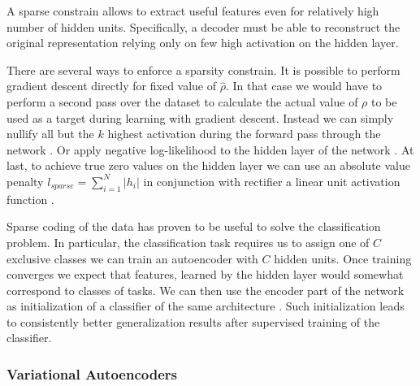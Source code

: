 A sparse constrain allows to extract useful features even for relatively high number of hidden units. Specifically, a decoder must be able to reconstruct the original representation relying only on few high activation on the hidden layer.

There are several ways to enforce a sparsity constrain.
It is possible to perform gradient descent directly for fixed value of $\hat{\rho}$. In that case we would have to perform a second pass over the dataset to calculate the actual value of $\rho$ to be used as a target during learning with gradient descent. Instead we can simply nullify all but the $k$ highest activation during the forward pass through the network \cite{Kulkarni2015}.
Or apply negative log-likelihood to the hidden layer of the network \cite{Zhao2015}.
At last, to achieve true zero values on the hidden layer we can use an absolute value penalty $l_{sparse}=\sum_{i=1}^N |h_i|$ in conjunction with rectifier a linear unit activation function \cite{Glorot2011}.

Sparse coding of the data has proven to be useful to solve the classification problem.
In particular, the classification task requires us to assign one of $C$ exclusive classes we can train an autoencoder with $C$ hidden units. Once training converges we expect that features, learned by the hidden layer would somewhat correspond to classes of tasks. We can then use the encoder part of the network as initialization of a classifier of the same architecture \cite{Masci2011}.
Such initialization leads to consistently better generalization results after supervised training of the classifier.

\subsubsection{Variational Autoencoders}\label{ch:vae}



